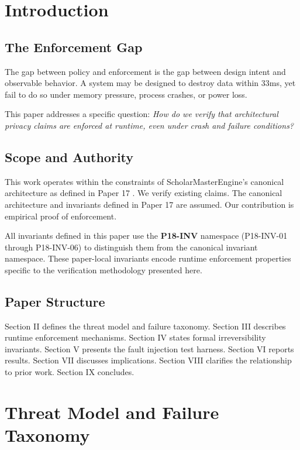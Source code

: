 \documentclass[conference]{IEEEtran}
\begin{document}
\section{Introduction}

\subsection{The Enforcement Gap}
The gap between policy and enforcement is the gap between design intent and observable behavior. A system may be designed to destroy data within 33ms, yet fail to do so under memory pressure, process crashes, or power loss. 

This paper addresses a specific question: \textit{How do we verify that architectural privacy claims are enforced at runtime, even under crash and failure conditions?}

\subsection{Scope and Authority}
This work operates within the constraints of ScholarMasterEngine's canonical architecture as defined in Paper 17 \cite{b17}. We verify existing claims. The canonical architecture and invariants defined in Paper 17 are assumed. Our contribution is empirical proof of enforcement.

All invariants defined in this paper use the \textbf{P18-INV} namespace (P18-INV-01 through P18-INV-06) to distinguish them from the canonical invariant namespace. These paper-local invariants encode runtime enforcement properties specific to the verification methodology presented here.

\subsection{Paper Structure}
Section II defines the threat model and failure taxonomy. Section III describes runtime enforcement mechanisms. Section IV states formal irreversibility invariants. Section V presents the fault injection test harness. Section VI reports results. Section VII discusses implications. Section VIII clarifies the relationship to prior work. Section IX concludes.

\section{Threat Model and Failure Taxonomy}
\end{document}
